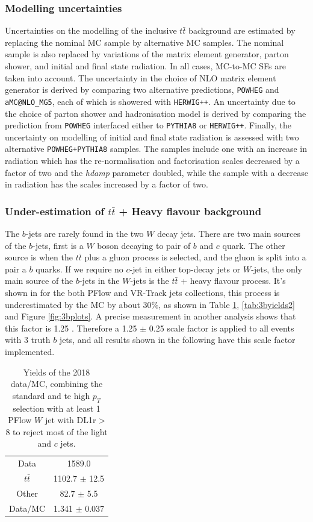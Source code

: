 \documentclass[letterpaper,12pt]{article}
\begin{document}
\subsubsection{Modelling uncertainties} Uncertainties on the modelling of the inclusive $t\bar{t}$ background are estimated by replacing the nominal MC sample by alternative MC samples. The nominal sample is also replaced by variations of the matrix element generator, parton shower, and initial and final state radiation. In all cases, MC-to-MC SFs are taken into account. The uncertainty in the choice of NLO matrix element generator is derived by comparing two alternative predictions, {\tt POWHEG} and {\tt aMC@NLO\_MG5}, each of which is showered with {\tt HERWIG++}. An uncertainty due to the choice of parton shower and hadronisation model is derived by comparing the prediction from {\tt POWHEG} interfaced either to {\tt PYTHIA8} or {\tt HERWIG++}. Finally, the uncertainty on modelling of initial and final state radiation is assessed with two alternative {\tt POWHEG+PYTHIA8} samples. The samples include one with an increase in radiation which has the re-normalisation and factorisation scales decreased by a factor of two and the \textit{hdamp} parameter doubled, while the sample with a decrease in radiation has the scales increased by a factor of two.

\subsubsection{Under-estimation of $t\bar{t}$ + Heavy flavour background }
The $b$-jets are rarely found in the two $W$ decay jets. There are two main sources of the $b$-jets, first is a $W$ boson decaying to pair of $b$ and $c$ quark. The other source is when the $t\bar{t}$ plus a gluon process is selected, and the gluon is split into a pair a $b$ quarks. If we require no $c$-jet in either top-decay jets or $W$-jets, the only main source of the $b$-jets in the $W$-jets is the $t\bar{t}$ + heavy flavour process. It's shown in for the both PFlow and VR-Track jets collections, this process is underestimated by the MC by about 30\%, as shown in Table \ref{tab:3byields1}, \ref{tab:3byields2} and Figure \ref{fig:3bplots}. A precise measurement in another analysis shows that this factor is 1.25 \cite{ttbar+HF SF}. Therefore a 1.25 $\pm$ 0.25 scale factor is applied to all events with 3 truth $b$ jets, and all results shown in the following have this scale factor implemented. 
\begin{table}[]
    \centering
    \begin{tabular}{c|c}
        Data & 1589.0 \\
         $t\bar{t}$ & 1102.7 $\pm$ 12.5 \\
         Other & 82.7 $\pm$ 5.5 \\
         Data/MC & 1.341 $\pm$ 0.037 \\
    \end{tabular}
    \caption{Yields of the 2018 data/MC, combining the standard and te high $p_T$ selection with at least 1 PFlow $W$ jet with DL1r > 8 to reject most of the light and $c$ jets.}
    \label{tab:3byields1}
\end{table}
\end{document}
